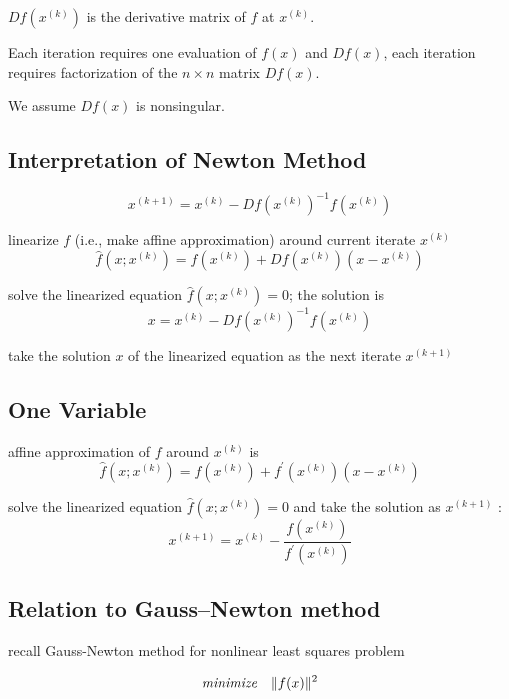 $ D f\left(x^{(k)}\right) $ is the derivative matrix of $ f $ at $ x^{(k)} $. 

Each iteration requires one evaluation of $ f(x) $ and $ D f(x) $, each iteration requires factorization of the $ n \times n $ matrix $ D f(x) $.

We assume $ D f(x) $ is nonsingular.

\subsection{Interpretation of Newton Method}

$$
x^{(k+1)}=x^{(k)}-D f\left(x^{(k)}\right)^{-1} f\left(x^{(k)}\right)
$$

linearize $ f $ (i.e., make affine approximation) around current iterate $ x^{(k)} $
$$
\hat{f}\left(x ; x^{(k)}\right)=f\left(x^{(k)}\right)+D f\left(x^{(k)}\right)\left(x-x^{(k)}\right)
$$

solve the linearized equation $ \hat{f}\left(x ; x^{(k)}\right)=0 $; the solution is
$$
x=x^{(k)}-D f\left(x^{(k)}\right)^{-1} f\left(x^{(k)}\right)
$$

take the solution $ x $ of the linearized equation as the next iterate $ x^{(k+1)} $

\subsection{One Variable}


affine approximation of $ f $ around $ x^{(k)} $ is
$$
\hat{f}\left(x ; x^{(k)}\right)=f\left(x^{(k)}\right)+f^{\prime}\left(x^{(k)}\right)\left(x-x^{(k)}\right)
$$

solve the linearized equation $ \hat{f}\left(x ; x^{(k)}\right)=0 $ and take the solution as $ x^{(k+1)} $ :
$$
x^{(k+1)}=x^{(k)}-\frac{f\left(x^{(k)}\right)}{f^{\prime}\left(x^{(k)}\right)}
$$

\subsection{Relation to Gauss–Newton method}

recall Gauss-Newton method for nonlinear least squares problem

\begin{problem}
    $$\term{minimize} \quad\|f(x)\|^{2} $$
\end{problem}

